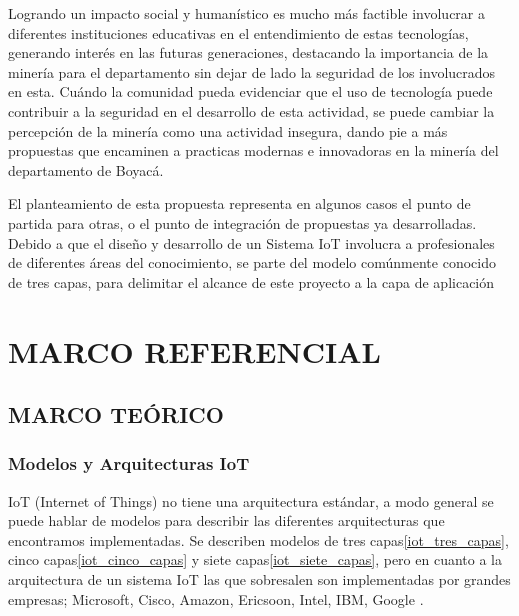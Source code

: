 \documentclass[stu,12pt,floatsintext]{apa7}
\begin{document}
	Logrando un impacto social y humanístico es mucho más factible involucrar a diferentes instituciones educativas en el entendimiento de estas tecnologías, generando interés en las futuras generaciones, destacando la importancia de la minería para el departamento sin dejar de lado la seguridad de los involucrados en esta.
	Cuándo la comunidad pueda evidenciar que el uso de tecnología puede contribuir a la seguridad en el desarrollo de esta actividad, se puede cambiar la percepción de la minería como una actividad insegura, dando pie a más propuestas que encaminen a practicas modernas e innovadoras en la minería del departamento de Boyacá.
	
	El planteamiento de esta propuesta representa en algunos casos el punto de partida para otras, o el punto de integración de propuestas ya desarrolladas.
	Debido a que el diseño y desarrollo de un Sistema IoT involucra a profesionales de diferentes áreas del conocimiento, se parte del modelo comúnmente conocido de tres capas, para delimitar el alcance de este proyecto a la capa de aplicación
	
	\section{MARCO REFERENCIAL}
	\subsection{MARCO TEÓRICO}
	\subsubsection{Modelos  y Arquitecturas IoT}
	IoT (Internet of Things) no tiene una arquitectura estándar, a modo general se puede hablar de modelos para describir las diferentes arquitecturas que encontramos implementadas. Se describen modelos de tres capas\ref{iot_tres_capas}, cinco capas\ref{iot_cinco_capas} y siete capas\ref{iot_siete_capas}, pero en cuanto a la arquitectura de un sistema IoT las que sobresalen son implementadas por grandes empresas; Microsoft, Cisco, Amazon, Ericsoon, Intel, IBM, Google \cite{DBLP:journals/corr/abs-2004-12936}.
	
\end{document}
